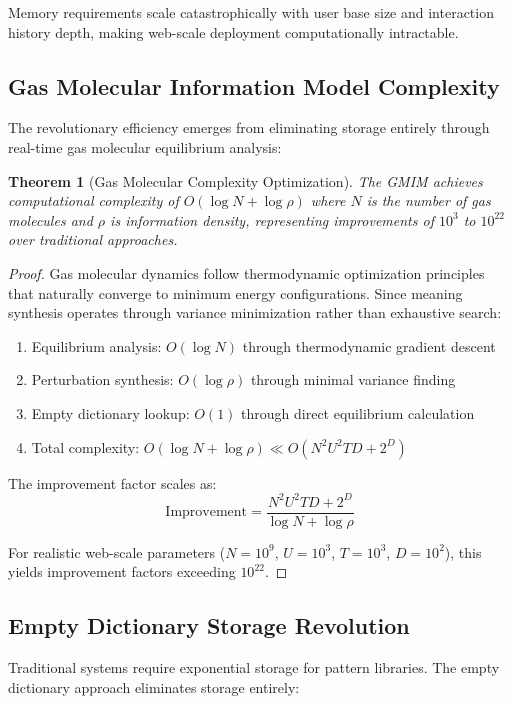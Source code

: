 \documentclass[12pt,a4paper]{article}
\newtheorem{theorem}{Theorem}
\begin{document}
Memory requirements scale catastrophically with user base size and interaction history depth, making web-scale deployment computationally intractable.

\subsection{Gas Molecular Information Model Complexity}

The revolutionary efficiency emerges from eliminating storage entirely through real-time gas molecular equilibrium analysis:

\begin{theorem}[Gas Molecular Complexity Optimization]
The GMIM achieves computational complexity of $O(\log N + \log \rho)$ where $N$ is the number of gas molecules and $\rho$ is information density, representing improvements of $10^3$ to $10^{22}$ over traditional approaches.
\end{theorem}

\begin{proof}
Gas molecular dynamics follow thermodynamic optimization principles that naturally converge to minimum energy configurations. Since meaning synthesis operates through variance minimization rather than exhaustive search:

\begin{enumerate}
\item Equilibrium analysis: $O(\log N)$ through thermodynamic gradient descent
\item Perturbation synthesis: $O(\log \rho)$ through minimal variance finding
\item Empty dictionary lookup: $O(1)$ through direct equilibrium calculation
\item Total complexity: $O(\log N + \log \rho) \ll O(N^2 U^2 T D + 2^D)$
\end{enumerate}

The improvement factor scales as:
$$\text{Improvement} = \frac{N^2 U^2 T D + 2^D}{\log N + \log \rho}$$

For realistic web-scale parameters ($N = 10^9$, $U = 10^3$, $T = 10^3$, $D = 10^2$), this yields improvement factors exceeding $10^{22}$.
\end{proof}

\subsection{Empty Dictionary Storage Revolution}

Traditional systems require exponential storage for pattern libraries. The empty dictionary approach eliminates storage entirely:
\end{document}
